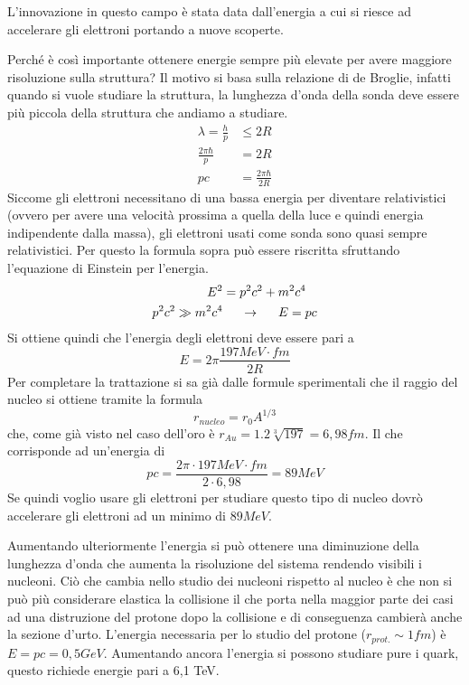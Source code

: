 L'innovazione in questo campo è stata data dall'energia a cui si riesce ad accelerare gli elettroni portando a nuove scoperte.

Perché è così importante ottenere energie sempre più elevate per avere maggiore risoluzione sulla struttura?
Il motivo si basa sulla relazione di de Broglie, infatti quando si vuole studiare la struttura, la lunghezza d'onda della sonda deve essere più piccola della struttura che andiamo a studiare.
\begin{equation}
\begin{split}
\lambda=\frac{h}{p}&\leq 2R\\
\frac{2\pi\hbar}{p}&=2R\\
pc&=\frac{2\pi\hbar}{2R}
\end{split}
\end{equation}
Siccome gli elettroni necessitano di una bassa energia per diventare relativistici (ovvero per avere una velocità prossima a quella della luce e quindi energia indipendente dalla massa), gli elettroni usati come sonda sono quasi sempre relativistici. Per questo la formula sopra può essere riscritta sfruttando l'equazione di Einstein per l'energia.
\begin{equation}
\begin{split}
E^2 &=p^2c^2+m^2c^4\\
p^2c^2 \gg m^2c^4 &\hspace{0.5cm}\to\hspace{0.5cm}E=pc
\end{split}
\end{equation}
Si ottiene quindi che l'energia degli elettroni deve essere pari a 
\begin{equation}
E=2\pi\frac{197MeV\cdot fm}{2R}
\end{equation}
Per completare la trattazione si sa già dalle formule sperimentali che il raggio del nucleo si ottiene tramite la formula
\begin{equation}
r_{nucleo}=r_0A^{1/3}
\end{equation}
che, come già visto nel caso dell'oro è $r_{Au}=1.2\sqrt[3]{197}=6,98 fm$.
Il che corrisponde ad un'energia di
\begin{equation}
pc=\frac{2\pi\cdot 197MeV\cdot fm}{2\cdot6,98}=89MeV
\end{equation}
Se quindi voglio usare gli elettroni per studiare questo tipo di nucleo dovrò accelerare gli elettroni ad un minimo di $89 MeV$.

Aumentando ulteriormente l'energia si può ottenere una diminuzione della lunghezza d'onda che aumenta la risoluzione del sistema rendendo visibili i nucleoni.
Ciò che cambia nello studio dei nucleoni rispetto al nucleo è che non si può più considerare elastica la collisione il che porta nella maggior parte dei casi ad una distruzione del protone dopo la collisione e di conseguenza cambierà anche la sezione d'urto.
L'energia necessaria per lo studio del protone ($r_{prot.}\sim 1fm$) è $E=pc=0,5GeV$.
Aumentando ancora l'energia si possono studiare pure i quark, questo richiede energie pari a 6,1 TeV.

